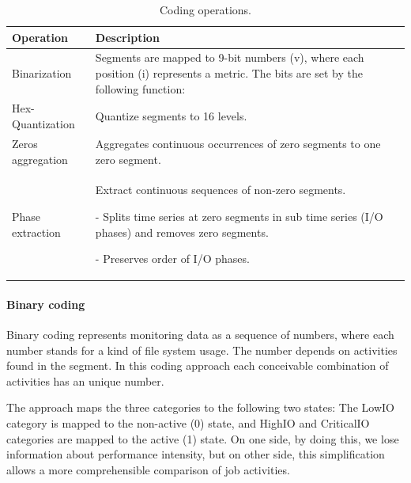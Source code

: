 \documentclass[]{llncs}
\makeatletter
\newcommand{\eb}[1]{\todo[inline]{EB:\@#1}}
\makeatother
\begin{document}
\begin{table}
  \centering
	\begin{tabularx}{\textwidth}{lX}
    \hline
    Operation &  Description \\
    \hline
    Binarization & Segments are mapped to 9-bit numbers (v), where each position (i) represents a metric. The bits are set by the following function: \eb{equation missing}\\
    \hline
    Hex-Quantization & Quantize segments to 16 levels. \\
    \hline
    Zeros aggregation & Aggregates continuous occurrences of zero segments to one zero segment. \\
    \hline 
    Phase extraction &  Extract continuous sequences of non-zero segments. \par - Splits time series at zero segments in sub time series (I/O phases) and removes zero segments. \par - Preserves order of I/O phases. \\
    \hline
  \end{tabularx}
  \caption{Coding operations.}
  \label{tab:coding_ops}
\end{table}


\paragraph{Binary coding}
Binary coding represents monitoring data as a sequence of numbers, where each number stands for a kind of file system usage.
The number depends on activities found in the segment.
In this coding approach each conceivable combination of activities has an unique number.

The approach maps the three categories to the following two states: The LowIO category is mapped to the non-active (0) state, and HighIO and CriticalIO categories are mapped to the active (1) state.
On one side, by doing this, we lose information about performance intensity, but on other side, this simplification allows a more comprehensible comparison of job activities.
\end{document}
